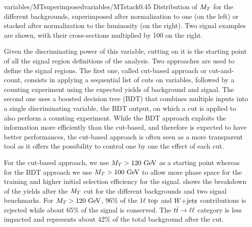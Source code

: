                     {variables/MTsuperimposed}{variables/MTstack}{0.45}
                     {Distribution of $M_T$ for the different backgrounds, superimposed
                     after normalization to one (on the left) or stacked after normalization
                     to the luminosity (on the right). Two signal examples are shown, with
                     their cross-sections multiplied by 100 on the right.}

    Given the discriminating power of this variable, cutting on it is the
    starting point of all the signal region definitions of the analysis. Two
    approaches are used to define the signal regions. The first one, called
    cut-based approach or cut-and-count, consists in applying a sequential list
    of cuts on variables, followed by a counting experiment using the expected
    yields of background and signal. The second one uses a boosted decision tree
    (BDT) that combines multiple inputs into a single discriminating variable,
    the BDT output, on which a cut is applied to also perform a counting
    experiment. While the BDT approach exploits the information more efficiently
    than the cut-based, and therefore is expected to have better performances,
    the cut-based approach is often seen as a more transparent tool as it offers
    the possibility to control one by one the effect of each cut.

    For the cut-based approach, we use $M_T > 120 ~\text{GeV}$ as a starting point
    whereas for the BDT approach we use $M_T > 100 ~\text{GeV}$ to allow more phase
    space for the training and higher initial selection efficiency for the
    signal.  shows the breakdown of the yields after the
    $M_T$ cut for the different backgrounds and two signal benchmarks.  For $M_T
    > 120~\text{GeV}$, 96\% of the $1\ell~\text{top}$ and $\text{$W$+jets}$ contributions is
    rejected while about 65\% of the signal is conserved. The $t\bar{t} \rightarrow \ell \ell$
    category is less impacted and represents about 42\% of the total background
    after the cut.

